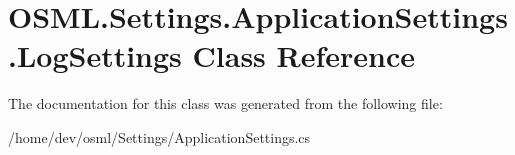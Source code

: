 \hypertarget{classOSML_1_1Settings_1_1ApplicationSettings_1_1LogSettings}{}\section{O\+S\+M\+L.\+Settings.\+Application\+Settings.\+Log\+Settings Class Reference}
\label{classOSML_1_1Settings_1_1ApplicationSettings_1_1LogSettings}


The documentation for this class was generated from the following file\+:\begin{DoxyCompactItemize}
\item 
/home/dev/osml/\+Settings/Application\+Settings.\+cs\end{DoxyCompactItemize}
